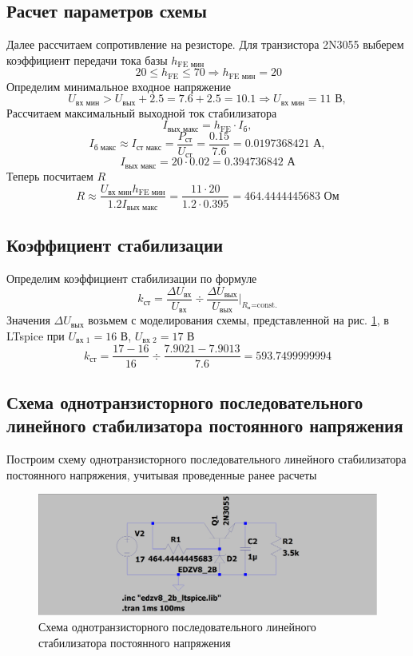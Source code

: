 \documentclass[a4paper, 12pt]{article}
\begin{document}
    
    \subsection{Расчет параметров схемы}
    Далее рассчитаем сопротивление на резисторе.
    Для транзистора 2N3055 выберем коэффициент передачи тока базы $h_{\text{FE мин}}$
    $$\,20\leq h_{\text{FE}}\leq70\Rightarrow h_{\text{FE мин}}=20$$
    Определим минимальное входное напряжение
    $$
    U_{\text{вх мин}}>U_{\text{вых}}+2.5=7.6+2.5=10.1\Rightarrow U_{\text{вх мин}}=11\text{ В},
    $$
    Рассчитаем максимальный выходной ток стабилизатора
    $$
    I_{\text{вых макс}}=h_{\text{FE}}\cdot I_{\text{б}},
    $$
    $$
    I_{\text{б макс}}\approx I_{\text{ст макс}}=\dfrac{P_{\text{ст}}}{U_{\text{ст}}}=\dfrac{0.15}{7.6}=0.0197368421\text{ А},
    $$
    $$
    I_{\text{вых макс}}=20\cdot0.02=0.394736842\text{ А}
    $$
    Теперь посчитаем $R$
    $$
    R\approx\dfrac{U_{\text{вх мин}}h_{\text{FE мин}}}{1.2I_{\text{вых макс}}}=\dfrac{11\cdot20}{1.2\cdot0.395}=464.4444445683\text{ Ом}
    $$


    \subsection{Коэффициент стабилизации}
    Определим коэффициент стабилизации по формуле
    $$
    k_{\text{ст}}=\dfrac{\Delta U_{\text{вх}}}{U_{\text{вх}}}\div\dfrac{\Delta U_{\text{вых}}}{U_{\text{вых}}}\bigg|_{R_\text{н}\text{=const.}}
    $$
    Значения $\Delta U_{\text{вых}}$ возьмем с моделирования схемы, представленной на рис. \ref{fig:2task_scheme_AC}, в LTspice
    при $U_{\text{вх 1}}=16$ В, $U_{\text{вх 2}}=17$ В
    $$
    k_{\text{ст}}=\dfrac{17-16}{16}\div\dfrac{7.9021-7.9013}{7.6}=593.7499999994
    $$


    \subsection{Схема однотранзисторного последовательного линейного стабилизатора постоянного напряжения}
    Построим схему однотранзисторного последовательного линейного стабилизатора постоянного напряжения, учитывая проведенные ранее расчеты
    \begin{figure}[H]
        \centering
        \includegraphics[scale=0.22]{2task_scheme_AC.png}
        \captionsetup{skip=0pt}
        \caption{Схема однотранзисторного последовательного линейного стабилизатора постоянного напряжения}
        \label{fig:2task_scheme_AC}
    \end{figure}
\end{document}
